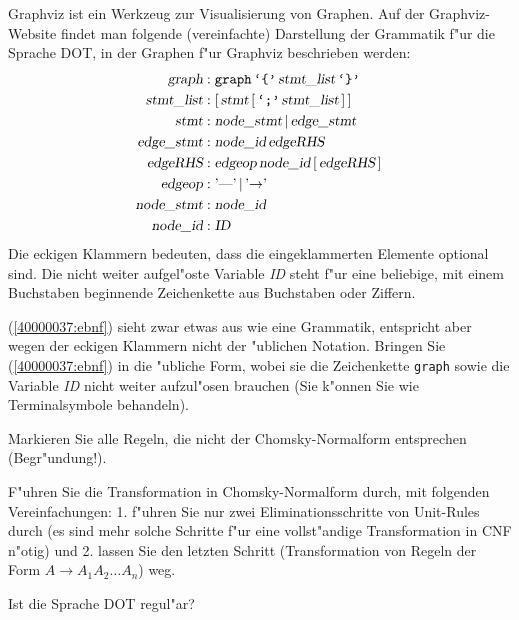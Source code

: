 Graphviz ist ein Werkzeug zur Visualisierung von Graphen. Auf der
Graphviz-Website findet man folgende (vereinfachte) Darstellung der Grammatik
f"ur die Sprache DOT, in der Graphen f"ur Graphviz beschrieben werden:
\begin{equation}
\begin{aligned}
\textsl{graph}     &: \texttt{graph}\, \texttt{`\{'}\, \textsl{stmt\_list}\, \texttt{`\}'} \\
\textsl{stmt\_list}&: [\, \textsl{stmt}\, [\, \texttt{`;'}\, \textsl{stmt\_list}\, ]\, ] \\
\textsl{stmt}      &: \textsl{node\_stmt}\, |\, \textsl{edge\_stmt} \\
\textsl{edge\_stmt}&: \textsl{node\_id}\, \textsl{edgeRHS} \\
\textsl{edgeRHS}   &: \textsl{edgeop}\, \textsl{node\_id}\, [\, \textsl{edgeRHS}\, ]\, \\
\textsl{edgeop}    &: \textrm{'\text{---}'}\, |\, \textrm{'$\rightarrow$'}\, \\
\textsl{node\_stmt}&: \textsl{node\_id} \\
\textsl{node\_id}  &: \textsl{ID}
\end{aligned}
\label{40000037:ebnf}
\end{equation}
Die eckigen Klammern bedeuten, dass die eingeklammerten Elemente optional sind.
Die nicht weiter aufgel"oste Variable \textsl{ID} steht f"ur eine beliebige,
mit einem Buchstaben beginnende Zeichenkette aus Buchstaben oder Ziffern.

\begin{teilaufgaben}
\item
(\ref{40000037:ebnf}) sieht zwar etwas aus wie eine Grammatik,
entspricht aber wegen der eckigen Klammern nicht der "ublichen Notation.
Bringen Sie (\ref{40000037:ebnf}) in die "ubliche Form, wobei sie
die Zeichenkette \texttt{graph} sowie die Variable
\textsl{ID} nicht weiter aufzul"osen brauchen (Sie k"onnen Sie wie Terminalsymbole
behandeln).
\item Markieren Sie alle Regeln, die nicht der Chomsky-Normalform 
entsprechen (Begr"undung!).
\item F"uhren Sie die Transformation in Chomsky-Normalform durch, mit folgenden
Vereinfachungen: 1. f"uhren Sie nur zwei Eliminationsschritte von Unit-Rules durch
(es sind mehr solche Schritte f"ur eine vollst"andige Transformation in CNF n"otig)
und 2. lassen Sie den letzten Schritt (Transformation von Regeln der Form
$A\to A_1A_2\dots A_n$) weg.
\item Ist die Sprache DOT regul"ar?
\end{teilaufgaben}

